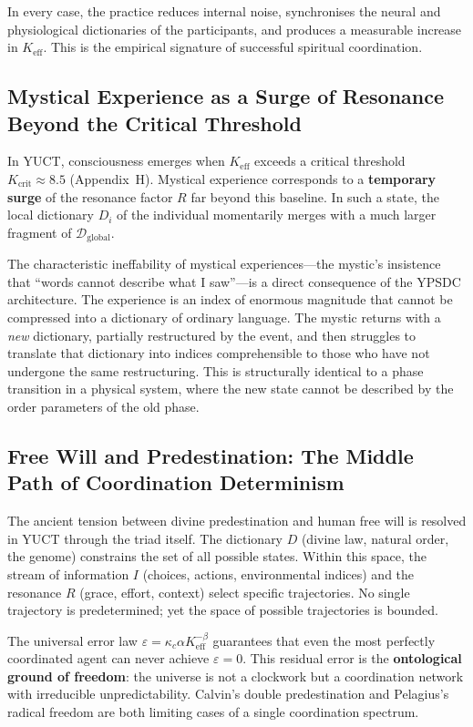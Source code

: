\documentclass[12pt,a4paper]{article}
\begin{document}
	In every case, the practice reduces internal noise, synchronises the neural and physiological dictionaries of the participants, and produces a measurable increase in \(K_{\mathrm{eff}}\). This is the empirical signature of successful spiritual coordination.
	
	\subsection{Mystical Experience as a Surge of Resonance Beyond the Critical Threshold}
	
	In YUCT, consciousness emerges when \(K_{\mathrm{eff}}\) exceeds a critical threshold \(K_{\mathrm{crit}} \approx 8.5\) (Appendix~H). Mystical experience corresponds to a \textbf{temporary surge} of the resonance factor \(R\) far beyond this baseline. In such a state, the local dictionary \(D_i\) of the individual momentarily merges with a much larger fragment of \(\mathcal{D}_{\text{global}}\).
	
	The characteristic ineffability of mystical experiences—the mystic’s insistence that “words cannot describe what I saw”—is a direct consequence of the YPSDC architecture. The experience is an index of enormous magnitude that cannot be compressed into a dictionary of ordinary language. The mystic returns with a \emph{new} dictionary, partially restructured by the event, and then struggles to translate that dictionary into indices comprehensible to those who have not undergone the same restructuring. This is structurally identical to a phase transition in a physical system, where the new state cannot be described by the order parameters of the old phase.
	
	\subsection{Free Will and Predestination: The Middle Path of Coordination Determinism}
	
	The ancient tension between divine predestination and human free will is resolved in YUCT through the triad itself. The dictionary \(D\) (divine law, natural order, the genome) constrains the set of all possible states. Within this space, the stream of information \(I\) (choices, actions, environmental indices) and the resonance \(R\) (grace, effort, context) select specific trajectories. No single trajectory is predetermined; yet the space of possible trajectories is bounded.
	
	The universal error law \(\varepsilon = \kappa_c \alpha K_{\mathrm{eff}}^{-\beta}\) guarantees that even the most perfectly coordinated agent can never achieve \(\varepsilon = 0\). This residual error is the \textbf{ontological ground of freedom}: the universe is not a clockwork but a coordination network with irreducible unpredictability. Calvin’s double predestination and Pelagius’s radical freedom are both limiting cases of a single coordination spectrum.
	
\end{document}
